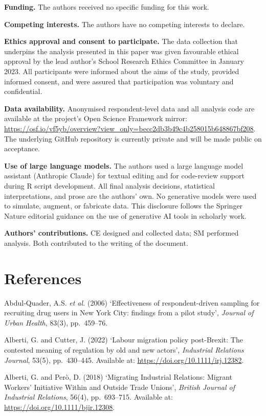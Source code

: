 \documentclass[
  12pt,
  letterpaper,
  DIV=11,
  numbers=noendperiod]{scrartcl}
\begin{document}
\textbf{Funding.} The authors received no specific funding for this
work.

\textbf{Competing interests.} The authors have no competing interests to
declare.

\textbf{Ethics approval and consent to participate.} The data collection
that underpins the analysis presented in this paper was given favourable
ethical approval by the lead author's School Research Ethics Committee
in January 2023. All participants were informed about the aims of the
study, provided informed consent, and were assured that participation
was voluntary and confidential.

\textbf{Data availability.} Anonymised respondent-level data and all
analysis code are available at the project's Open Science Framework
mirror:
\url{https://osf.io/vf5yb/overview?view_only=becc2db3b49c4b258015b648867bf208}.
The underlying GitHub repository is currently private and will be made
public on acceptance.

\textbf{Use of large language models.} The authors used a large language
model assistant (Anthropic Claude) for textual editing and for
code-review support during R script development. All final analysis
decisions, statistical interpretations, and prose are the authors' own.
No generative models were used to simulate, augment, or fabricate data.
This disclosure follows the Springer Nature editorial guidance on the
use of generative AI tools in scholarly work.

\textbf{Authors' contributions.} CE designed and collected data; SM
performed analysis. Both contributed to the writing of the document.

\newpage

\section{References}\label{references}

Abdul-Quader, A.S. \emph{et al.} (2006) `Effectiveness of
respondent-driven sampling for recruiting drug users in New York City:
findings from a pilot study', \emph{Journal of Urban Health}, 83(3),
pp.~459--76.

Alberti, G. and Cutter, J. (2022) `Labour migration policy post-Brexit:
The contested meaning of regulation by old and new actors',
\emph{Industrial Relations Journal}, 53(5), pp.~430--445. Available at:
\url{https://doi.org/10.1111/irj.12382}.

Alberti, G. and Però, D. (2018) `Migrating Industrial Relations: Migrant
Workers' Initiative Within and Outside Trade Unions', \emph{British
Journal of Industrial Relations}, 56(4), pp.~693--715. Available at:
\url{https://doi.org/10.1111/bjir.12308}.
\end{document}
